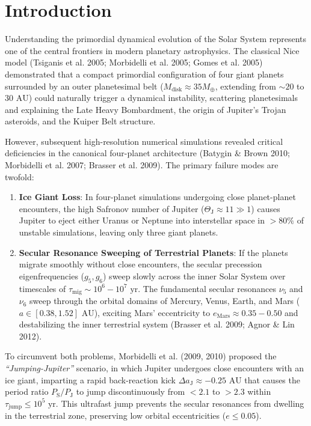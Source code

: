 \documentclass[11pt,a4paper]{article}
\begin{document}
\section{Introduction}
Understanding the primordial dynamical evolution of the Solar System represents one of the central frontiers in modern planetary astrophysics. The classical Nice model (Tsiganis et al. 2005; Morbidelli et al. 2005; Gomes et al. 2005) demonstrated that a compact primordial configuration of four giant planets surrounded by an outer planetesimal belt ($M_{\text{disk}} \approx 35 M_\oplus$, extending from $\sim 20$ to $30\text{ AU}$) could naturally trigger a dynamical instability, scattering planetesimals and explaining the Late Heavy Bombardment, the origin of Jupiter's Trojan asteroids, and the Kuiper Belt structure.

However, subsequent high-resolution numerical simulations revealed critical deficiencies in the canonical four-planet architecture (Batygin \& Brown 2010; Morbidelli et al. 2007; Brasser et al. 2009). The primary failure modes are twofold:
\begin{enumerate}
    \item \textbf{Ice Giant Loss}: In four-planet simulations undergoing close planet-planet encounters, the high Safronov number of Jupiter ($\Theta_{\text{J}} \approx 11 \gg 1$) causes Jupiter to eject either Uranus or Neptune into interstellar space in $>80\%$ of unstable simulations, leaving only three giant planets.
    \item \textbf{Secular Resonance Sweeping of Terrestrial Planets}: If the planets migrate smoothly without close encounters, the secular precession eigenfrequencies ($g_5, g_6$) sweep slowly across the inner Solar System over timescales of $\tau_{\text{mig}} \sim 10^6 - 10^7\text{ yr}$. The fundamental secular resonances $\nu_5$ and $\nu_6$ sweep through the orbital domains of Mercury, Venus, Earth, and Mars ($a \in [0.38, 1.52]\text{ AU}$), exciting Mars' eccentricity to $e_{\text{Mars}} \approx 0.35 - 0.50$ and destabilizing the inner terrestrial system (Brasser et al. 2009; Agnor \& Lin 2012).
\end{enumerate}

To circumvent both problems, Morbidelli et al. (2009, 2010) proposed the \textit{``Jumping-Jupiter''} scenario, in which Jupiter undergoes close encounters with an ice giant, imparting a rapid back-reaction kick $\Delta a_{\text{J}} \approx -0.25\text{ AU}$ that causes the period ratio $P_{\text{S}}/P_{\text{J}}$ to jump discontinuously from $<2.1$ to $>2.3$ within $\tau_{\text{jump}} \le 10^5\text{ yr}$. This ultrafast jump prevents the secular resonances from dwelling in the terrestrial zone, preserving low orbital eccentricities ($e \le 0.05$).
\end{document}

